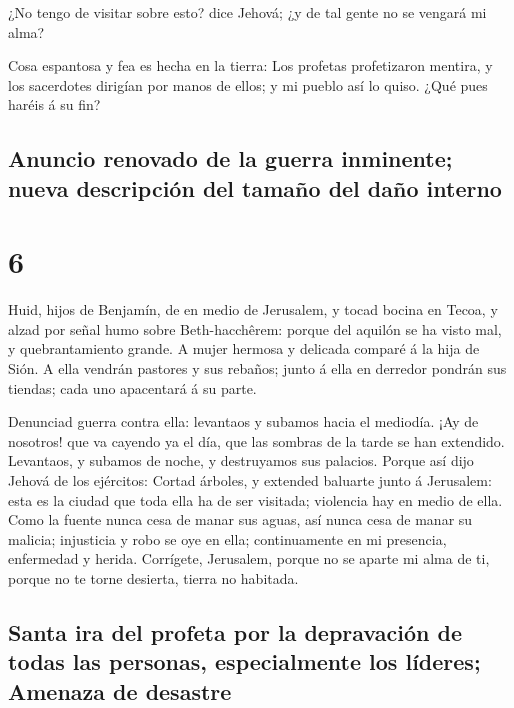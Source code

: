  ¿No tengo de visitar sobre esto? dice Jehová; ¿y de tal
gente no se vengará mi alma?

 Cosa espantosa y fea es hecha en la tierra: 
Los profetas profetizaron mentira, y los sacerdotes dirigían por manos
de ellos; y mi pueblo así lo quiso. ¿Qué pues haréis á su fin?

\hypertarget{anuncio-renovado-de-la-guerra-inminente-nueva-descripciuxf3n-del-tamauxf1o-del-dauxf1o-interno}{%
\subsection{Anuncio renovado de la guerra inminente; nueva descripción
del tamaño del daño
interno}\label{anuncio-renovado-de-la-guerra-inminente-nueva-descripciuxf3n-del-tamauxf1o-del-dauxf1o-interno}}

\hypertarget{section-5}{%
\section{6}\label{section-5}}

 Huid, hijos de Benjamín, de en medio de Jerusalem, y tocad
bocina en Tecoa, y alzad por señal humo sobre Beth-hacchêrem: porque del
aquilón se ha visto mal, y quebrantamiento grande.  A mujer
hermosa y delicada comparé á la hija de Sión.  A ella
vendrán pastores y sus rebaños; junto á ella en derredor pondrán sus
tiendas; cada uno apacentará á su parte.

 Denunciad guerra contra ella: levantaos y subamos hacia el
mediodía. ¡Ay de nosotros! que va cayendo ya el día, que las sombras de
la tarde se han extendido.  Levantaos, y subamos de noche, y
destruyamos sus palacios.  Porque así dijo Jehová de los
ejércitos: Cortad árboles, y extended baluarte junto á Jerusalem: esta
es la ciudad que toda ella ha de ser visitada; violencia hay en medio de
ella.  Como la fuente nunca cesa de manar sus aguas, así
nunca cesa de manar su malicia; injusticia y robo se oye en ella;
continuamente en mi presencia, enfermedad y herida. 
Corrígete, Jerusalem, porque no se aparte mi alma de ti, porque no te
torne desierta, tierra no habitada.

\hypertarget{santa-ira-del-profeta-por-la-depravaciuxf3n-de-todas-las-personas-especialmente-los-luxedderes-amenaza-de-desastre}{%
\subsection{Santa ira del profeta por la depravación de todas las
personas, especialmente los líderes; Amenaza de
desastre}\label{santa-ira-del-profeta-por-la-depravaciuxf3n-de-todas-las-personas-especialmente-los-luxedderes-amenaza-de-desastre}}

